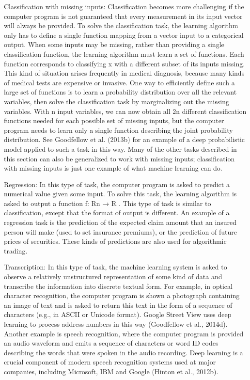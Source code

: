 \documentclass[11pt]{article}
\begin{document}
Classification with missing inputs: Classification becomes more challenging if the computer program is not guaranteed that every measurement in its input vector will always be provided.
To solve the classification task, the learning algorithm only has to define a single function mapping from a vector input to a categorical output.
When some inputs may be missing, rather than providing a single classification function, the learning algorithm must learn a set of functions.
Each function corresponds to classifying x with a different subset of its inputs missing.
This kind of situation arises frequently in medical diagnosis, because many kinds of medical tests are expensive or invasive.
One way to eﬃciently define such a large set of functions is to learn a probability distribution over all the relevant variables, then solve the classification task by marginalizing out the missing variables.
With n input variables, we can now obtain all 2n different classiﬁcation functions needed for each possible set of missing inputs, but the computer program needs to learn only a single function describing the joint probability distribution.
See Goodfellow et al. (2013b) for an example of a deep probabilistic model applied to such a task in this way.
Many of the other tasks described in this section can also be generalized to work with missing inputs;
classification with missing inputs is just one example of what machine learning can do.

Regression: In this type of task, the computer program is asked to predict a numerical value given some input.
To solve this task, the learning algorithm is asked to output a function f: Rn → R .
This type of task is similar to classification, except that the format of output is different.
An example of a regression task is the prediction of the expected claim amount that an insured person will make (used to set insurance premiums), or the prediction of future prices of securities.
These kinds of predictions are also used for algorithmic trading.

Transcription: In this type of task, the machine learning system is asked to observe a relatively unstructured representation of some kind of data and transcribe the information into discrete textual form.
For example, in optical character recognition, the computer program is shown a photograph containing an image of text and is asked to return this text in the form of a sequence of characters (e.g., in ASCII or Unicode format).
Google Street View uses deep learning to process address numbers in this way (Goodfellow et al., 2014d).
Another example is speech recognition, where the computer program is provided an audio waveform and emits a sequence of characters or word ID codes describing the words that were spoken in the audio recording.
Deep learning is a crucial component of modern speech recognition systems used at major companies, including Microsoft, IBM and Google (Hinton et al., 2012b).
\end{document}
